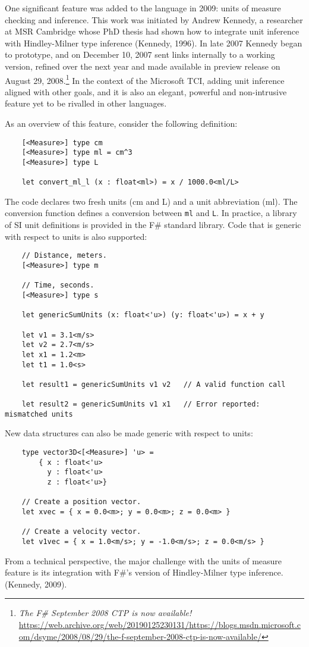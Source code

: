 \documentclass[acmsmall,review]{acmart}\settopmatter{printfolios=true,printccs=false,printacmref=false}
\begin{document}
One significant feature was added to the language in 2009: units of measure checking and inference.  This
work was initiated by Andrew Kennedy, a researcher at MSR Cambridge whose PhD thesis had shown how to integrate
unit inference with Hindley-Milner type inference (Kennedy, 1996). In late 2007 Kennedy began to prototype, and on
December 10, 2007 sent links internally to a working version, refined over the next year and made available in preview
release on August 29, 2008.\footnote{\textit{The F\# September 2008 CTP is now available!} \url{https://web.archive.org/web/20190125230131/https://blogs.msdn.microsoft.com/dsyme/2008/08/29/the-f-september-2008-ctp-is-now-available/}}
In the context of the Microsoft TCI, adding unit inference aligned with other goals, and it
is also an elegant, powerful and non-intrusive feature yet to be rivalled in other languages.

As an overview of this feature, consider the following definition:

\begin{verbatim}
    [<Measure>] type cm
    [<Measure>] type ml = cm^3
    [<Measure>] type L

    let convert_ml_l (x : float<ml>) = x / 1000.0<ml/L>
\end{verbatim}

The code declares two fresh units (cm and L) and a unit abbreviation (ml).  The conversion function defines a conversion
between \texttt{ml} and \texttt{L}.  In practice, a library of SI unit definitions is provided in the F\# standard library.  Code
that is generic with respect to units is also supported:

\begin{verbatim}
    // Distance, meters.
    [<Measure>] type m

    // Time, seconds.
    [<Measure>] type s

    let genericSumUnits (x: float<'u>) (y: float<'u>) = x + y

    let v1 = 3.1<m/s>
    let v2 = 2.7<m/s>
    let x1 = 1.2<m>
    let t1 = 1.0<s>

    let result1 = genericSumUnits v1 v2   // A valid function call

    let result2 = genericSumUnits v1 x1   // Error reported: mismatched units
\end{verbatim}
New data structures can also be made generic with respect to units:
\begin{verbatim}
    type vector3D<[<Measure>] 'u> =
        { x : float<'u>
          y : float<'u>
          z : float<'u>}

    // Create a position vector.
    let xvec = { x = 0.0<m>; y = 0.0<m>; z = 0.0<m> }

    // Create a velocity vector.
    let v1vec = { x = 1.0<m/s>; y = -1.0<m/s>; z = 0.0<m/s> }
\end{verbatim}
From a technical perspective, the major challenge with the units of measure feature is its integration with F\#’s version of Hindley-Milner type inference. (Kennedy, 2009).
\end{document}

